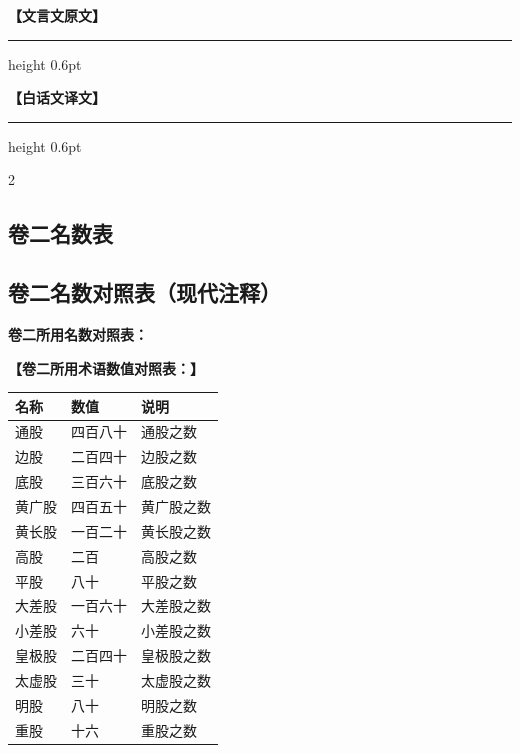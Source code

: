 \documentclass[11pt,a4paper]{article}
\newcommand{\colheaders}{%
  \noindent\begin{minipage}[t]{0.48\textwidth}\centering
    \textbf{\color{classicalframe}【文言文原文】}
    \vspace{0.3em}
    \hrule height 0.6pt
  \end{minipage}%
  \hfill
  \begin{minipage}[t]{0.48\textwidth}\centering
    \textbf{\color{modernframe}【白话文译文】}
    \vspace{0.3em}
    \hrule height 0.6pt
  \end{minipage}
  \par\medskip
}
\begin{document}
\clearpage
\colheaders
\begin{paracol}{2}

\subsection*{卷二名数表}

\switchcolumn
\subsection*{卷二名数对照表（现代注释）}

\switchcolumn*

\noindent
\textbf{卷二所用名数对照表：}

\switchcolumn
\noindent
\textbf{【卷二所用术语数值对照表：】}

\switchcolumn*

\begin{center}
\begin{tabular}{|l|l|l|}
\hline
\textbf{名称} & \textbf{数值} & \textbf{说明} \\
\hline
通股 & 四百八十 & 通股之数 \\
\hline
边股 & 二百四十 & 边股之数 \\
\hline
底股 & 三百六十 & 底股之数 \\
\hline
黄广股 & 四百五十 & 黄广股之数 \\
\hline
黄长股 & 一百二十 & 黄长股之数 \\
\hline
高股 & 二百 & 高股之数 \\
\hline
平股 & 八十 & 平股之数 \\
\hline
大差股 & 一百六十 & 大差股之数 \\
\hline
小差股 & 六十 & 小差股之数 \\
\hline
皇极股 & 二百四十 & 皇极股之数 \\
\hline
太虚股 & 三十 & 太虚股之数 \\
\hline
明股 & 八十 & 明股之数 \\
\hline
重股 & 十六 & 重股之数 \\
\hline
\end{tabular}
\end{center}

\switchcolumn


\end{paracol}
\end{document}
